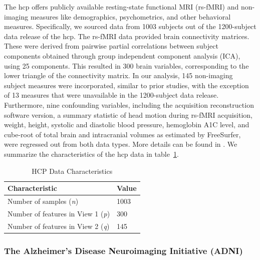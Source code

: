 The \acrshort{hcp} offers publicly available resting-state functional MRI (rs-fMRI) and non-imaging measures like demographics, psychometrics, and other behavioral measures.
Specifically, we sourced data from 1003 subjects out of the 1200-subject data release of the \acrshort{hcp}.
The rs-fMRI data provided brain connectivity matrices. These were derived from pairwise partial correlations between subject components obtained through group independent component analysis (ICA), using 25 components. This resulted in 300 brain variables, corresponding to the lower triangle of the connectivity matrix. In our analysis, 145 non-imaging subject measures were incorporated, similar to prior studies, with the exception of 13 measures that were unavailable in the 1200-subject data release. Furthermore, nine confounding variables, including the acquisition reconstruction software version, a summary statistic of head motion during rs-fMRI acquisition, weight, height, systolic and diastolic blood pressure, hemoglobin A1C level, and cube-root of total brain and intracranial volumes as estimated by FreeSurfer, were regressed out from both data types.
More details can be found in \citet{smith2015positive, mihalik2022canonical}.
We summarize the characteristics of the \acrshort{hcp} data in table~\ref{tab:hcp-parameters}.

\begin{table}
    \centering
    \caption{HCP Data Characteristics}
    \begin{tabular}{| l | l |}
        \hline
        \textbf{Characteristic}                        & \textbf{Value} \\
        \hline
        Number of samples (\textit{n})            & 1003           \\
        Number of features in View 1 (\textit{p}) & 300          \\
        Number of features in View 2 (\textit{q}) & 145            \\
        \hline
    \end{tabular}\label{tab:hcp-parameters}
\end{table}

\subsubsection{The Alzheimer's Disease Neuroimaging Initiative (ADNI)}

